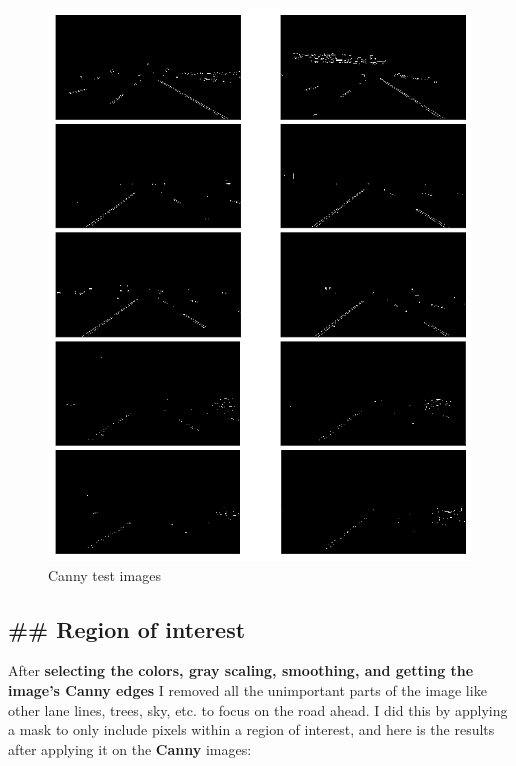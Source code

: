\documentclass[11pt]{article}
\makeatletter
\def\maxwidth{\ifdim\Gin@nat@width>\linewidth\linewidth
    \else\Gin@nat@width\fi}
\let\Oldincludegraphics\includegraphics
\renewcommand{\includegraphics}[1]{\Oldincludegraphics[width=.8\maxwidth]{#1}}
\makeatother
\begin{document}
\begin{figure}
\centering
\includegraphics{test_images_output/canny_test_images.png}
\caption{Canny test images}
\end{figure}

\hypertarget{region-of-interest}{%
\subsection{\#\# Region of interest}\label{region-of-interest}}

After \textbf{selecting the colors, gray scaling, smoothing, and getting
the image's Canny edges} I removed all the unimportant parts of the
image like other lane lines, trees, sky, etc. to focus on the road
ahead. I did this by applying a mask to only include pixels within a
region of interest, and here is the results after applying it on the
\textbf{Canny} images:
\end{document}
